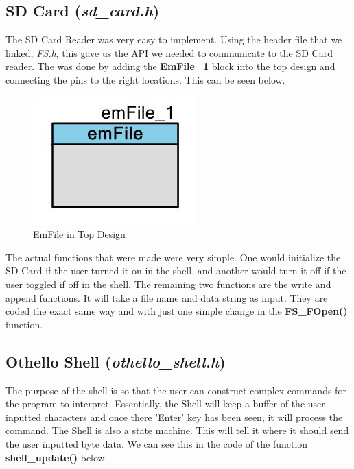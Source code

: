\documentclass[a4paper, 12pt]{article}
\begin{document}
    


    
    \subsection{SD Card (\textit{sd\_card.h})}

    The SD Card Reader was very easy to implement. Using the header file that
    we linked, \textit{FS.h}, this gave us the API we needed to communicate to
    the SD Card reader. The was done by adding the \textbf{EmFile\_1} block
    into the top design and connecting the pins to the right locations. This
    can be seen below.
    
    \begin{figure}[H]
        \centering
        \includegraphics[scale=0.6]{pics/sd_card}
        \caption{EmFile in Top Design}
        \label{fig:TopDesign}
    \end{figure}
    
     The actual functions that were made were very simple. One would initialize
    the SD Card if the user turned it on in the shell, and another would
    turn it off if the user toggled if off in the shell.
    The remaining two functions are the write and append functions. It will
    take a file name and data string as input. They are coded the exact same
    way and with just one simple change in the \textbf{FS\_FOpen()} function.





    
    \subsection{Othello Shell (\textit{othello\_shell.h})}

    The purpose of the shell is so that the user can construct complex commands
    for the program to interpret. Essentially, the Shell will keep a buffer of
    the user inputted characters and once there 'Enter' key has been seen, it
    will process the command. The Shell is also a state machine. This will tell
    it where it should send the user inputted byte data. We can see this in
    the code of the function \textbf{shell\_update()} below.
\end{document}
